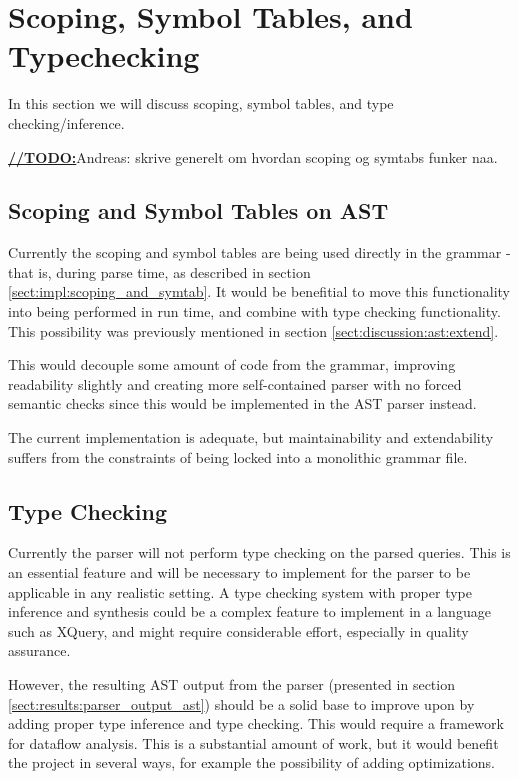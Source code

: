 \section{Scoping, Symbol Tables, and Typechecking}
In this section we will discuss scoping, symbol tables, and type
checking/inference.

\underline{\textbf{\LARGE //TODO:}}Andreas: skrive generelt om hvordan scoping
og symtabs funker naa.

\subsection{Scoping and Symbol Tables on AST}
\label{sect:discussion:scoping_and_symtab}
Currently the scoping and symbol tables are being used directly in the grammar -
that is, during parse time, as described in section
\ref{sect:impl:scoping_and_symtab}. It would be benefitial to move this
functionality into being performed in run time, and combine with type checking
functionality. This possibility was previously mentioned in section
\ref{sect:discussion:ast:extend}.

This would decouple some amount of code from the grammar, improving readability
slightly and creating more self-contained parser with no forced semantic checks
since this would be implemented in the AST parser instead.

The current implementation is adequate, but maintainability and extendability
suffers from the constraints of being locked into a monolithic grammar file.

\subsection{Type Checking}
Currently the parser will not perform type checking on the parsed queries. This
is an essential feature and will be necessary to implement for the parser to be
applicable in any realistic setting. A type checking system with proper type
inference and synthesis could be a complex feature to implement in a language
such as XQuery, and might require considerable effort, especially in quality
assurance. 

However, the resulting AST output from the parser (presented in section
\ref{sect:results:parser_output_ast}) should be a solid base to improve upon by
adding proper type inference and type checking. This would require a framework
for dataflow analysis. This is a substantial amount of work, but it would
benefit the project in several ways, for example the possibility of adding
optimizations.